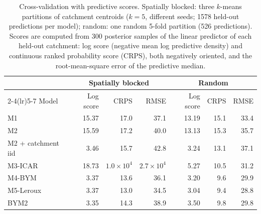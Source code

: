\begin{table}[h]
\caption{Cross-validation with predictive scores. Spatially blocked: three $k$-means partitions of catchment centroids ($k = 5$, different seeds; 1578 held-out predictions per model); random: one random 5-fold partition (526 predictions). Scores are computed from 300 posterior samples of the linear predictor of each held-out catchment: log score (negative mean log predictive density) and continuous ranked probability score (CRPS), both negatively oriented, and the root-mean-square error of the predictive median.}\label{tabA4b}
\footnotesize
\begin{tabular}{@{}lrrrrrr@{}}
\toprule
 & \multicolumn{3}{c}{Spatially blocked} & \multicolumn{3}{c}{Random} \\
\cmidrule(lr){2-4}\cmidrule(lr){5-7}
Model & Log score & CRPS & RMSE & Log score & CRPS & RMSE \\
\midrule
M1 & 15.37 & 17.0 & 37.1 & 13.19 & 15.1 & 33.4 \\
M2 & 15.59 & 17.2 & 40.0 & 13.13 & 15.3 & 35.7 \\
M2 + catchment iid & 3.46 & 15.7 & 42.8 & 3.24 & 13.1 & 37.1 \\
M3-ICAR & 18.73 & $1.0 \times 10^{4}$ & $2.7 \times 10^{4}$ & 5.27 & 10.5 & 31.2 \\
M4-BYM & 3.37 & 13.6 & 36.1 & 3.20 & 9.6 & 29.9 \\
M5-Leroux & 3.37 & 13.0 & 34.5 & 3.04 & 9.4 & 28.8 \\
BYM2 & 3.35 & 14.3 & 38.9 & 3.50 & 9.8 & 29.8 \\
\bottomrule
\end{tabular}
\end{table}
